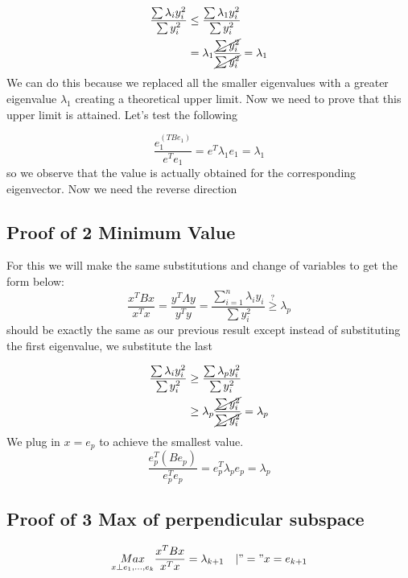 \begin{align*}
\frac{\sum \lambda_iy^2_i}{\sum y_i^2} &\leq \frac{\sum \lambda_1y^2_i}{\sum y_i^2} \\
&= \lambda_1\frac{\cancel{\sum y^2_i}}{\cancel{\sum y^2_i}} =\lambda_1
\end{align*}
We can do this because we replaced all the smaller eigenvalues with a greater eigenvalue $\lambda_1$ creating a theoretical upper limit. Now we need to prove that this upper limit is attained. Let's test the following

\begin{equation*}
    \frac{e_1^(TBe_1)}{e^Te_1} = 
    e^T\lambda_1e_1 = \lambda_1
\end{equation*}
so we observe that the value is actually obtained for the corresponding eigenvector. Now we need the reverse direction

\subsection{Proof of 2 Minimum Value}
For this we will make the same substitutions and change of variables to get the form below:
\begin{equation*}
    \frac{x^TBx}{x^Tx} =
    \frac{y^T\Lambda y}{y^Ty} = 
    \frac{\displaystyle\sum_{i=1}^{n} \lambda_i y_i}{\sum{y_i^2}} \overset{?}{\geq} \lambda_p
\end{equation*}
should be exactly the same as our previous result except instead of substituting the first eigenvalue, we substitute the last

\begin{align*}
\frac{\sum \lambda_iy^2_i}{\sum y_i^2} &\geq \frac{\sum \lambda_py^2_i}{\sum y_i^2} \\
&\geq \lambda_p\frac{\cancel{\sum y^2_i}}{\cancel{\sum y^2_i}} =\lambda_p
\end{align*}
We plug in $x = e_p$ to achieve the smallest value.
\begin{equation*}
    \frac{e_p^T(Be_p)}{e_p^Te_p} = 
    e_p^T\lambda_pe_p = \lambda_p
\end{equation*}

\subsection{Proof of 3 Max of perpendicular subspace}


\begin{equation*}
    \underset{x\perp e_1,...,e_k}{Max}\frac{x^TBx}{x^Tx} = \lambda_{k+1} \quad | "=" x=e_{k+1}
\end{equation*}

